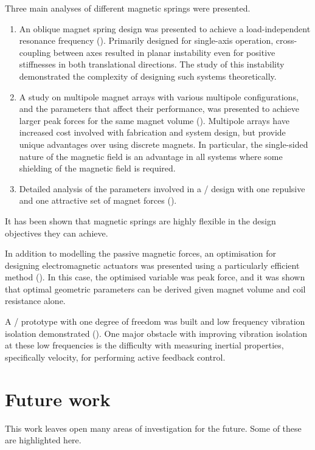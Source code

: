 \documentclass[10pt,a4paper]{memoir}
\begin{document}
Three main analyses of different magnetic springs were presented.
\begin{enumerate}
\item
An oblique magnet spring design was presented to achieve a load-independent resonance frequency ().
Primarily designed for single-axis operation, cross-coupling between axes resulted in planar instability even for positive stiffnesses in both translational directions.
The study of this instability demonstrated the complexity of designing such systems theoretically.

\item
A study on multipole magnet arrays with various multipole configurations, and the parameters that affect their performance, was presented to achieve larger peak forces for the same magnet volume ().
Multipole arrays have increased cost involved with fabrication and system design, but provide unique advantages over using discrete magnets.
In particular, the single-sided nature of the magnetic field is an advantage in all systems where some shielding of the magnetic field is required.

\item
Detailed analysis of the parameters involved in a \qzs/ design with one repulsive and one attractive set of magnet forces ().
\end{enumerate}
It has been shown that magnetic springs are highly flexible in the design objectives they can achieve.

In addition to modelling the passive magnetic forces, an optimisation for designing electromagnetic actuators was presented using a particularly efficient method ().
In this case, the optimised variable was peak force, and it was shown that optimal geometric parameters can be derived given magnet volume and coil resistance alone.

A \qzs/ prototype with one degree of freedom was built and low frequency vibration isolation demonstrated ().
One major obstacle with improving vibration isolation at these low frequencies is the difficulty with measuring inertial properties, specifically velocity, for performing active feedback control.

\section{Future work}

This work leaves open many areas of investigation for the future.
Some of these are highlighted here.
\end{document}
